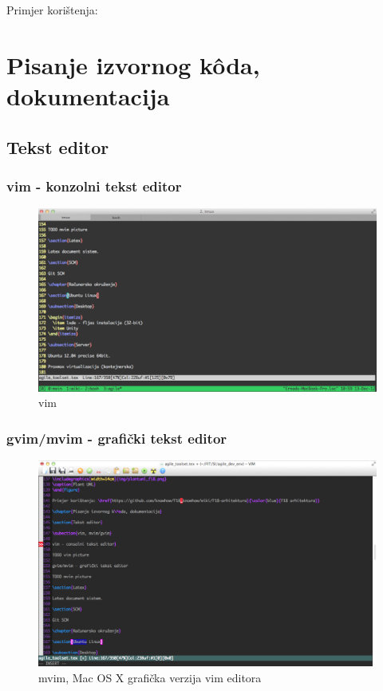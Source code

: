 \documentclass[times, utf8, seminar]{fit}
\begin{document}
Primjer korištenja: \href{https://github.com/knowhow/F18_knowhow/wiki/F18-arhitektura}{\color{blue}{F18 arhitektura}}

\chapter{Pisanje izvornog k\^oda, dokumentacija}

\section{Tekst editor}

\subsection{vim - konzolni tekst editor}

\begin{figure}[H]
\centering
\includegraphics[width=14cm]{img/vim.png}
\caption{vim}
\end{figure}

\subsection{gvim/mvim - grafički tekst editor}

\begin{figure}[H]
\centering
\includegraphics[width=14cm]{img/mvim.png}
\caption{mvim, Mac OS X grafička verzija vim editora}
\end{figure}
\end{document}
